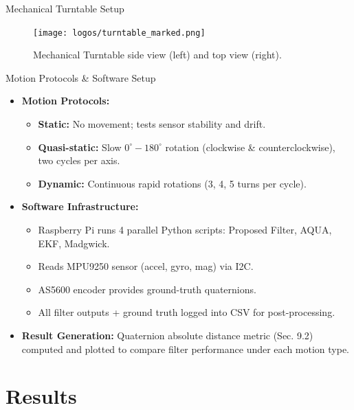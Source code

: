 \documentclass[aspectratio=169,xcolor=dvipsnames]{beamer}
\begin{document}
  \begin{frame}{Mechanical Turntable Setup}
  \begin{figure}
    \centering
    \texttt{[image: logos/turntable\_marked.png]}  
    \caption{Mechanical Turntable side view (left) and top view (right).}    
    \label{fig:turntable}
  \end{figure}
  \end{frame}
  
  
  \begin{frame}{Motion Protocols \& Software Setup}
  \begin{itemize}
      \item \textbf{Motion Protocols:}
      \begin{itemize}
          \item \textbf{Static:} No movement; tests sensor stability and drift.  
          \item \textbf{Quasi-static:} Slow $0^{\circ}\!\!-\!180^{\circ}$ rotation (clockwise \& counterclockwise), two cycles per axis.  
          \item \textbf{Dynamic:} Continuous rapid rotations (3, 4, 5 turns per cycle).
      \end{itemize}
  
      \item \textbf{Software Infrastructure:}  
      \begin{itemize}
          \item Raspberry Pi runs 4 parallel Python scripts: Proposed Filter, AQUA, EKF, Madgwick.  
          \item Reads MPU9250 sensor (accel, gyro, mag) via I2C.  
          \item AS5600 encoder provides ground-truth quaternions.  
          \item All filter outputs + ground truth logged into CSV for post-processing.
      \end{itemize}
  
      \item \textbf{Result Generation:}  
      Quaternion absolute distance metric (Sec. 9.2) computed and plotted to compare filter performance under each motion type.
  \end{itemize}
  \end{frame}
  


\section{Results}
\end{document}
